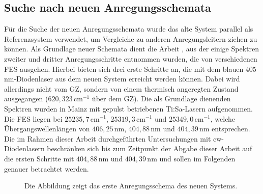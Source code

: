 \subsection{Suche nach neuen Anregungsschemata}\label{subsec:schema_suche}
Für die Suche der neuen Anregungsschemata wurde das alte System parallel als
Referenzsystem verwendet, um Vergleiche zu anderen Anregungsleitern ziehen
zu können. Als Grundlage neuer Schemata dient die Arbeit
\cite{raeder:2011:dissertation}, aus der einige Spektren zweiter und dritter
Anregungsschritte entnommen wurden, die von verschiedenen FES ausgehen. Hierbei
bieten sich drei erste Schritte an, die mit dem blauen $405\,$nm-Diodenlaser aus dem neuen System erreicht werden können. Dabei wird allerdings nicht vom GZ, sondern von einem thermisch angeregten
Zustand ausgegangen ($620,323\,$cm$^{-1}$ über dem GZ). Die als
Grundlage dienenden Spektren wurden in Mainz mit gepulst betriebenen
Ti:Sa-Lasern aufgenommen. Die FES liegen bei $25235,7\,$cm$^{-1}$,
$25319,3\,$cm$^{-1}$ und $25349,0\,$cm$^{-1}$, welche Übergangswellenlängen von $406,25\,$nm, $404,88\,$nm und $404,39\,$nm
entsprechen. Die im Rahmen dieser Arbeit durchgeführten Untersuchungen mit
cw-Diodenlasern beschränken sich bis zum Zeitpunkt der Abgabe dieser Arbeit auf
die ersten Schritte mit $404,88\,$nm und $404,39\,$nm und sollen im Folgenden genauer
betrachtet werden.\par
\begin{figure}[h]
 	\centering
	\caption[Anregungsschema, neu (1)]{Die Abbildung zeigt das
	erste Anregungsschema des neuen Systems.}\label{fig:anregungsschema_neu_01}
\end{figure}
